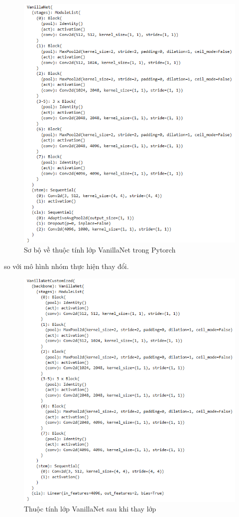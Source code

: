 \documentclass[a4paper,12pt]{article}
\begin{document}
\begin{figure}[H]
    \centering
    \includegraphics[width=\linewidth]{vanillanet-ondev.png}
    \caption{Sơ bộ về thuộc tính lớp VanillaNet trong Pytorch}
\end{figure}

\noindent so với mô hình nhóm thực hiện thay đổi.

\begin{figure}[H]
    \centering
    \includegraphics[width=\linewidth]{vanillanet-customized-ondev.png}
    \caption{Thuộc tính lớp VanillaNet sau khi thay lớp}
\end{figure}
\end{document}
